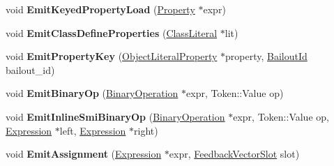 \begin{DoxyCompactItemize}
\item 
void {\bfseries Emit\+Keyed\+Property\+Load} (\hyperlink{classv8_1_1internal_1_1_property}{Property} $\ast$expr)\hypertarget{classv8_1_1internal_1_1_full_code_generator_a4c3257711dc247374d42b58cb83860b9}{}\label{classv8_1_1internal_1_1_full_code_generator_a4c3257711dc247374d42b58cb83860b9}

\item 
void {\bfseries Emit\+Class\+Define\+Properties} (\hyperlink{classv8_1_1internal_1_1_class_literal}{Class\+Literal} $\ast$lit)\hypertarget{classv8_1_1internal_1_1_full_code_generator_a574f7a2e4aa5aa2730067b81883a5ac5}{}\label{classv8_1_1internal_1_1_full_code_generator_a574f7a2e4aa5aa2730067b81883a5ac5}

\item 
void {\bfseries Emit\+Property\+Key} (\hyperlink{classv8_1_1internal_1_1_object_literal_property}{Object\+Literal\+Property} $\ast$property, \hyperlink{classv8_1_1internal_1_1_bailout_id}{Bailout\+Id} bailout\+\_\+id)\hypertarget{classv8_1_1internal_1_1_full_code_generator_a20317196f73cf658bc186eb8b6c754f8}{}\label{classv8_1_1internal_1_1_full_code_generator_a20317196f73cf658bc186eb8b6c754f8}

\item 
void {\bfseries Emit\+Binary\+Op} (\hyperlink{classv8_1_1internal_1_1_binary_operation}{Binary\+Operation} $\ast$expr, Token\+::\+Value op)\hypertarget{classv8_1_1internal_1_1_full_code_generator_ae59352dcc8dac97c1d88a106b40e8cf3}{}\label{classv8_1_1internal_1_1_full_code_generator_ae59352dcc8dac97c1d88a106b40e8cf3}

\item 
void {\bfseries Emit\+Inline\+Smi\+Binary\+Op} (\hyperlink{classv8_1_1internal_1_1_binary_operation}{Binary\+Operation} $\ast$expr, Token\+::\+Value op, \hyperlink{classv8_1_1internal_1_1_expression}{Expression} $\ast$left, \hyperlink{classv8_1_1internal_1_1_expression}{Expression} $\ast$right)\hypertarget{classv8_1_1internal_1_1_full_code_generator_adae0d360cdf7b203470d070e9177eff3}{}\label{classv8_1_1internal_1_1_full_code_generator_adae0d360cdf7b203470d070e9177eff3}

\item 
void {\bfseries Emit\+Assignment} (\hyperlink{classv8_1_1internal_1_1_expression}{Expression} $\ast$expr, \hyperlink{classv8_1_1internal_1_1_feedback_vector_slot}{Feedback\+Vector\+Slot} slot)\hypertarget{classv8_1_1internal_1_1_full_code_generator_a298c73e5102b04c55cf4b8cdf2b88de4}{}\label{classv8_1_1internal_1_1_full_code_generator_a298c73e5102b04c55cf4b8cdf2b88de4}


\end{DoxyCompactItemize}
